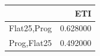 \begin{tabular}{lr}
\toprule
 & ETI \\
\midrule
Flat25,Prog & 0.628000 \\
Prog,Flat25 & 0.492000 \\
\bottomrule
\end{tabular}
